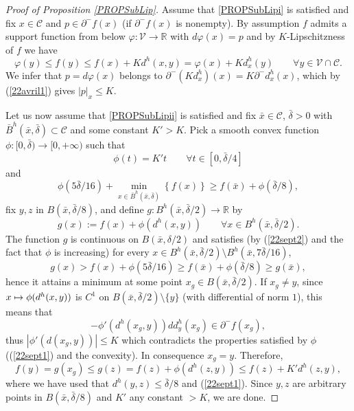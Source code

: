 \documentclass[JEP,XML,SOM,Unicode,NoFloatCountersInSection,published]{cedram}
\newcommand\mto{\mathchoice{\longmapsto}{\mapsto}{\mapsto}{\mapsto}}
\newcommand\R{\mathbb R}
\theoremstyle{definition}
\begin{document}
\begin{proof}[Proof of Proposition \ref{PROPSubLip}]
Assume that \eqref{PROPSubLipi} is satisfied and fix $x\in \mathcal{C}$ and $p\in \partial^-f(x)$ (if $\partial^-f(x)$ is nonempty). By assumption $f$ admits a support function from below $\varphi:\mathcal{V}\to \R$ with $d\varphi(x)=p$ and by $K$-Lipschitzness of $f$ we have
\[
\varphi(y) \leq f(y) \leq f(x) + Kd^h(x,y) = \varphi(x) + Kd_x^h(y) \qquad \forall y\in \mathcal{V} \cap \mathcal{C}.
\]
We infer that $p=d\varphi(x)$ belongs to $\partial^- (Kd_x^h)(x)=K\partial^-d_x^h(x)$, which by (\ref{22avril1}) gives $|p|_x\leq K$.

Let us now assume that \eqref{PROPSubLipii} is satisfied and fix $\bar{x}\in \mathcal{C}$, $\bar{\delta}>0$ with $\bar{B}^h(\bar{x},\bar{\delta})\subset \mathcal{C}$ and some constant $K'>K$. Pick a smooth convex function $\phi : [0,\bar{\delta}) \to [0,+\infty)$ such that
\begin{equation}\label{22sept1}
\phi(t) = K't \qquad \forall t\in [0,\bar{\delta}/4]
\end{equation}
and
\begin{equation}\label{22sept2}
\phi(5\bar{\delta}/16) + \min_{x\in \bar{B}^h(\bar{x},\bar{\delta})} \left\{f(x)\right\} \geq f(\bar{x})+ \phi(\bar{\delta}/8),
\end{equation}
fix $y,z$ in $B(\bar{x},\bar{\delta}/8)$, and define $g:B^h(\bar{x},\bar{\delta}/2) \to \R$ by
\[
g(x):= f(x)+\phi \left(d^h(x,y) \right) \qquad \forall x \in B^h(\bar{x},\bar{\delta}/2).
\]
The function $g$ is continuous on $B(\bar{x},\delta/2)$ and satisfies (by (\ref{22sept2}) and the fact that $\phi$ is increasing) for every $x\in B^h(\bar{x},\bar{\delta}/2) \setminus B^h(\bar{x},7\bar{\delta}/16)$,
\[
g(x) > f(x) + \phi(5\bar{\delta}/16) \geq f(\bar{x})+ \phi(\bar{\delta}/8) \geq g(\bar{x}),
\]
hence it attains a minimum at some point $x_g\in B(\bar{x},\bar{\delta}/2)$. If $x_g\neq y$, since $x\mto \phi(d^h(x,y))$ is $C^1$ on $B(\bar{x},\bar{\delta}/2)\setminus \{y\}$ (with differential of norm $1$), this means that
\[
-\phi' \left(d^h(x_g,y)\right) dd_y^h(x_g) \in \partial^-f(x_g),
\]
thus $|\phi'(d(x_g,y))|\leq K$ which contradicts the properties satisfied by $\phi$ ((\ref{22sept1}) and the convexity). In consequence $x_g=y$. Therefore,
\[
f(y)=g(x_g) \leq g(z) =f(z)+\phi \left(d^h(z,y)\right) \leq f(z) +K'd^h(z,y),
\]
where we have used that $d^h(y,z)\leq \bar{\delta}/8$ and (\ref{22sept1}). Since $y,z$ are arbitrary points in $B(\bar{x},\bar{\delta}/8)$ and $K'$ any constant $>K$, we are done.
\end{proof}
\end{document}
